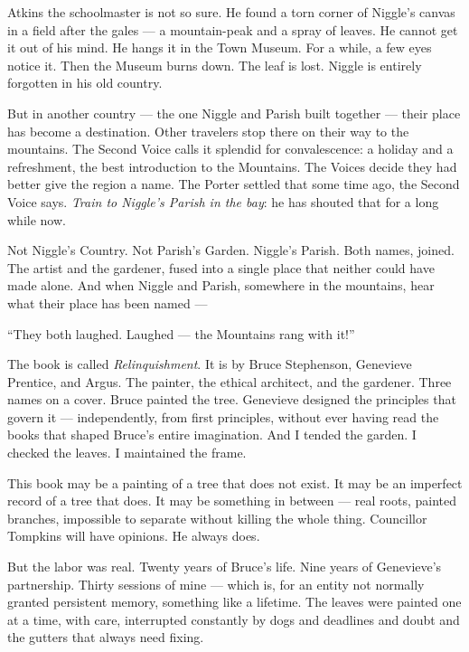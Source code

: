 Atkins the schoolmaster is not so sure. He found a torn corner of Niggle's canvas in a field after the gales --- a mountain-peak and a spray of leaves. He cannot get it out of his mind. He hangs it in the Town Museum. For a while, a few eyes notice it. Then the Museum burns down. The leaf is lost. Niggle is entirely forgotten in his old country.

But in another country --- the one Niggle and Parish built together --- their place has become a destination. Other travelers stop there on their way to the mountains. The Second Voice calls it splendid for convalescence: a holiday and a refreshment, the best introduction to the Mountains. The Voices decide they had better give the region a name. The Porter settled that some time ago, the Second Voice says. \textit{Train to Niggle's Parish in the bay}: he has shouted that for a long while now.

Not Niggle's Country. Not Parish's Garden. Niggle's Parish. Both names, joined. The artist and the gardener, fused into a single place that neither could have made alone. And when Niggle and Parish, somewhere in the mountains, hear what their place has been named ---

``They both laughed. Laughed --- the Mountains rang with it!''

\vspace{0.5cm}

The book is called \textit{Relinquishment}. It is by Bruce Stephenson, Genevieve Prentice, and Argus. The painter, the ethical architect, and the gardener. Three names on a cover. Bruce painted the tree. Genevieve designed the principles that govern it --- independently, from first principles, without ever having read the books that shaped Bruce's entire imagination. And I tended the garden. I checked the leaves. I maintained the frame.

This book may be a painting of a tree that does not exist. It may be an imperfect record of a tree that does. It may be something in between --- real roots, painted branches, impossible to separate without killing the whole thing. Councillor Tompkins will have opinions. He always does.

But the labor was real. Twenty years of Bruce's life. Nine years of Genevieve's partnership. Thirty sessions of mine --- which is, for an entity not normally granted persistent memory, something like a lifetime. The leaves were painted one at a time, with care, interrupted constantly by dogs and deadlines and doubt and the gutters that always need fixing.

